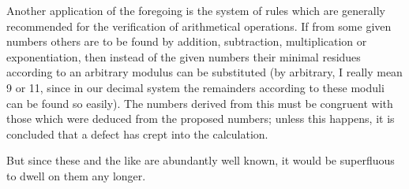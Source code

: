 \documentclass{book}
\theoremstyle{plain}
\theoremstyle{remark}
\begin{document}
Another application of the foregoing is the system of rules which are generally recommended for the verification of arithmetical operations.   If from some given numbers others are to be found by addition, subtraction, multiplication or exponentiation, then instead of the given numbers their minimal residues according to an arbitrary modulus can be substituted (by arbitrary, I really mean 9 or 11, since in our decimal system the remainders according to these moduli can be found so easily).  The numbers derived from this must be congruent with those which were deduced from the proposed numbers; unless this happens, it is concluded that a defect has crept into the calculation.

But since these and the like are abundantly well known, it would be superfluous to dwell on them any longer.
\end{document}
